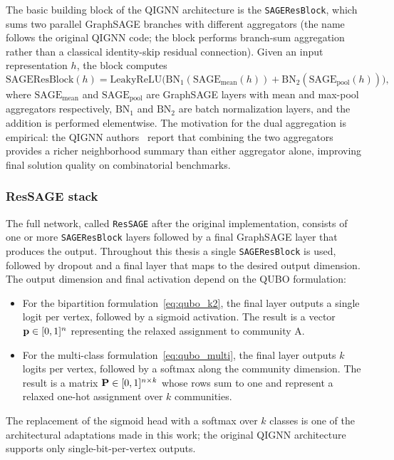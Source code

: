 The basic building block of the QIGNN architecture is the
\texttt{SAGEResBlock}, which sums two parallel GraphSAGE branches
with different aggregators (the name follows the original QIGNN
code; the block performs branch-sum aggregation rather than a
classical identity-skip residual connection).
Given an input representation $h$, the block computes
\begin{equation}
    \mathrm{SAGEResBlock}(h) = \mathrm{LeakyReLU}\bigl(
    \mathrm{BN}_1(\mathrm{SAGE}_{\mathrm{mean}}(h)) +
    \mathrm{BN}_2(\mathrm{SAGE}_{\mathrm{pool}}(h)) \bigr),
    \label{eq:resblock}
\end{equation}
where $\mathrm{SAGE}_{\mathrm{mean}}$ and
$\mathrm{SAGE}_{\mathrm{pool}}$ are GraphSAGE layers with mean and
max-pool aggregators respectively, $\mathrm{BN}_1$ and
$\mathrm{BN}_2$ are batch normalization layers, and the addition
is performed elementwise. The motivation for the dual aggregation
is empirical: the QIGNN authors~\cite{qignn2026} report that
combining the two aggregators provides a richer neighborhood
summary than either aggregator alone, improving final solution
quality on combinatorial benchmarks.


\subsubsection{ResSAGE stack}
\label{sec:method_ressage}

The full network, called \texttt{ResSAGE} after the original
implementation, consists of one or more \texttt{SAGEResBlock}
layers followed by a final GraphSAGE layer that produces the output.
Throughout this thesis a single \texttt{SAGEResBlock} is used,
followed by dropout and a final layer that maps to the desired
output dimension. The output dimension and final activation depend
on the QUBO formulation:
\begin{itemize}
    \item For the bipartition formulation~\eqref{eq:qubo_k2}, the
    final layer outputs a single logit per vertex, followed by a
    sigmoid activation. The result is a vector $\mathbf{p} \in [0,1]^n$
    representing the relaxed assignment to community A.

    \item For the multi-class formulation~\eqref{eq:qubo_multi},
    the final layer outputs $k$ logits per vertex, followed by a
    softmax along the community dimension. The result is a matrix
    $\mathbf{P} \in [0,1]^{n \times k}$ whose rows sum to one and represent
    a relaxed one-hot assignment over $k$ communities.
\end{itemize}
The replacement of the sigmoid head with a softmax over $k$ classes
is one of the architectural adaptations made in this work; the
original QIGNN architecture supports only single-bit-per-vertex outputs.


